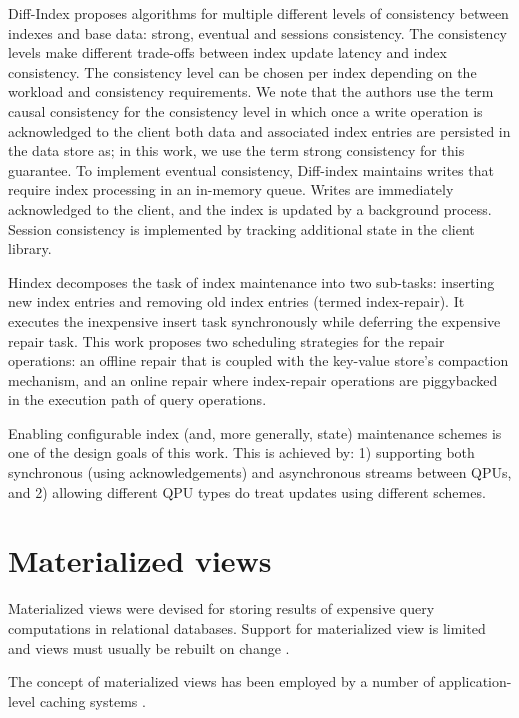 Diff-Index \cite{tan:diffindex} proposes algorithms for multiple different levels of consistency between indexes and base data:
strong, eventual and sessions consistency.
The consistency levels make different trade-offs between index update latency and index consistency.
The consistency level can be chosen per index depending on the workload and consistency requirements.
We note that the authors use the term causal consistency for the consistency level in which once a write operation is
acknowledged to the client both data and associated index entries are persisted in the data store as;
in this work, we use the term strong consistency for this guarantee.
To implement eventual consistency, Diff-index maintains writes that require index processing in an in-memory queue.
Writes are immediately acknowledged to the client, and the index is updated by a background process.
Session consistency is implemented by tracking additional state in the client library.

Hindex \cite{tang:deferredindexing} decomposes the task of index maintenance into two sub-tasks:
inserting new index entries and removing old index entries (termed index-repair).
It executes the inexpensive insert task synchronously while deferring the expensive repair task.
This work proposes two scheduling strategies for the repair operations:
an offline repair that is coupled with the key-value store’s compaction mechanism,
and an online repair where index-repair operations are piggybacked in the execution path of query operations.

\bibskip
\noindent

Enabling configurable index (and, more generally, state) maintenance schemes is one of the design goals of this work.
This is achieved by: 1) supporting both synchronous (using acknowledgements) and asynchronous streams between QPUs,
and 2) allowing different QPU types do treat updates using different schemes.


\section{Materialized views}
\label{sec:mv}
Materialized views were devised for storing results of expensive query computations in relational databases.
Support for materialized view is limited \cite{mysql:mvs} and views must usually be rebuilt on change \cite{postgresql:mvs}.

The concept of materialized views has been employed by a number of application-level caching systems
\cite{kate:pequod, amiri:dbproxy, gjengset:noria}.

